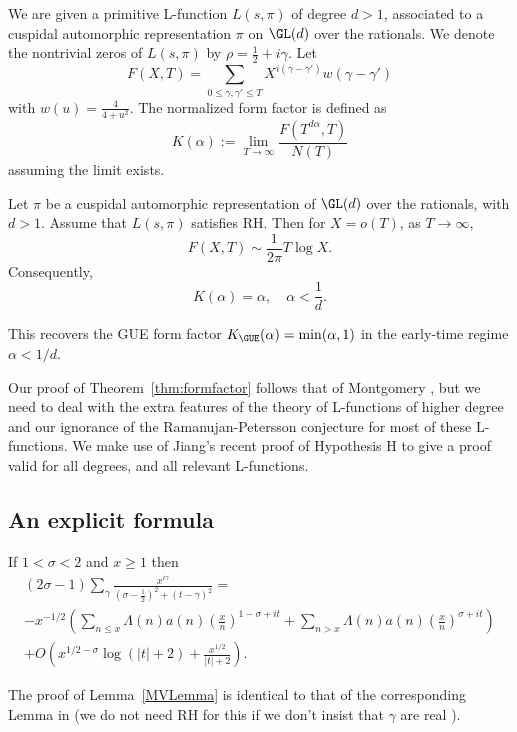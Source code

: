 \documentclass[12pt]{amsart}
\begin{document}
We are given a primitive L-function $L(s,\pi)$ of degree $d>1$, associated to a cuspidal automorphic representation $\pi$ on $\GL(d)$ over the rationals. 
 We denote the nontrivial zeros of $L(s,\pi)$ by $\rho = \tfrac 12 +i\gamma$. 
Let %
\[
F(X,T) = \sum_{0\leq \gamma,\gamma'\leq T} X^{i(\gamma-\gamma')} w(\gamma-\gamma')
\]
with  $w(u) = \frac{4}{4+u^2}$. 
The normalized form factor is defined as
\[
K(\alpha):=\lim_{T\to \infty} \frac{F(T^{d\alpha},T)}{N(T)} 
\]
assuming the limit exists. 
\begin{thm}\label{thm:formfactor}
Let $\pi$ be a cuspidal automorphic representation of $\GL(d)$ over the rationals, with $d>1$. Assume that $L(s,\pi)$ satisfies RH. Then for $X=o(T)$, as $T\to \infty$,
\[
F(X,T) \sim   \frac 1{2\pi} T\log X . 
\]
Consequently, 
\[
K(\alpha) = \alpha, \quad \alpha<\frac 1d.
\]
\end{thm}
This recovers the GUE form factor $K_{\GUE}(\alpha)=\min(\alpha,1)$ in the  early-time regime $\alpha< 1/d$. 

 

Our proof of Theorem~\ref{thm:formfactor} follows that of Montgomery \cite{MontgomeryPC}, but we need to deal with the extra features of the theory of L-functions of higher degree and our ignorance of the Ramanujan-Petersson conjecture for most of these L-functions. We make use of Jiang's recent proof of Hypothesis H \cite{Jiang} to give a proof valid for all degrees, and all relevant L-functions. 

 

 

\subsection{An explicit formula}
\begin{lem}\label{MVLemma}
If $1<\sigma<2$ and $x\geq 1$ then %
\begin{multline*}
(2\sigma-1)\sum_\gamma \frac{x^{i\gamma}}{(\sigma-\frac 12)^2 +(t-\gamma)^2} = 
\\
-x^{-1/2} \left( \sum_{n\leq x} \Lambda(n)a(n) \left( \frac{x}{n} \right)^{1-\sigma+it} + \sum_{n>x} \Lambda(n) a(n) \left( \frac xn\right)^{\sigma+it} \right) 
\\
+O\left(x^{1/2-\sigma}\log(|t|+2)+\frac{x^{1/2}}{|t|+2} \right) . 
\end{multline*}
\end{lem}
The proof of Lemma~\ref{MVLemma} is identical to that of the corresponding Lemma   in \cite{MontgomeryPC}    (we do not need RH for this if we don't insist that $\gamma$ are real \cite[Proposition 1]{Goldston notes}).
\end{document}
